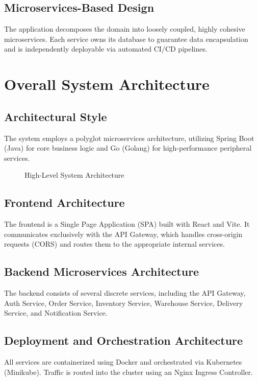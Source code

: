 \documentclass[12pt,a4paper]{report}
\begin{document}
\section{Microservices-Based Design}
The application decomposes the domain into loosely coupled, highly cohesive microservices. Each service owns its database to guarantee data encapsulation and is independently deployable via automated CI/CD pipelines.

\chapter{Overall System Architecture}

\section{Architectural Style}
The system employs a polyglot microservices architecture, utilizing Spring Boot (Java) for core business logic and Go (Golang) for high-performance peripheral services.

\begin{figure}[H]
    \centering
    \caption{High-Level System Architecture}
\end{figure}

\section{Frontend Architecture}
The frontend is a Single Page Application (SPA) built with React and Vite. It communicates exclusively with the API Gateway, which handles cross-origin requests (CORS) and routes them to the appropriate internal services.

\section{Backend Microservices Architecture}
The backend consists of several discrete services, including the API Gateway, Auth Service, Order Service, Inventory Service, Warehouse Service, Delivery Service, and Notification Service.

\section{Deployment and Orchestration Architecture}
All services are containerized using Docker and orchestrated via Kubernetes (Minikube). Traffic is routed into the cluster using an Nginx Ingress Controller.
\end{document}
